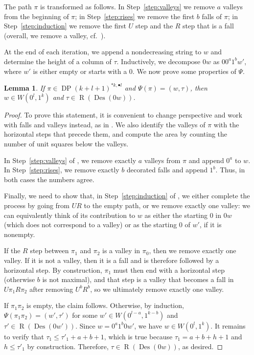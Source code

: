 \documentclass[reqno]{amsart}
\theoremstyle{plain}
\newtheorem{lemma}[theorem]{Lemma}
\theoremstyle{definition}
\theoremstyle{remark}
\DeclareMathOperator{\R}{R}
\DeclareMathOperator{\DP}{DP}
\DeclareMathOperator{\Des}{Des}
\newcommand{\<}{\langle}
\renewcommand{\>}{\rangle}
\begin{document}
The path $\pi$ is transformed as follows. In Step~\ref{step:valleys} we remove $a$ valleys from the beginning of $\pi$; in Step~\ref{step:rises} we remove the first $b$ falls of $\pi$; in Step~\ref{step:induction} we remove the first $U$ step and the $R$ step that is a fall (overall, we remove a valley, cf.\ ).

At the end of each iteration, we append a nondecreasing string to $w$ and determine the height of a column of $\tau$. Inductively, we decompose $0w$ as $0 0^a 1^b w'$, where $w'$ is either empty or starts with a $0$. We now prove some properties of $\Psi$.

\begin{lemma}
    \label{lem:well-defined}
    If $\pi \in \DP(k+l+1)^{\ast k, \bullet l}$ and $\Psi(\pi) = (w,\tau)$, then $w \in W(0^l,1^k)$ and $\tau \in \R(\Des(0w))$.
\end{lemma}

\begin{proof}
    To prove this statement, it is convenient to change perspective and work with falls and valleys instead, as in . We also identify the valleys of $\pi$ with the horizontal steps that precede them, and compute the area by counting the number of unit squares below the valleys.

    In Step~\ref{step:valleys} of , we remove exactly $a$ valleys from $\pi$ and append $0^a$ to $w$. In Step~\ref{step:rises}, we remove exactly $b$ decorated falls and append $1^b$. Thus, in both cases the numbers agree.

    Finally, we need to show that, in Step~\ref{step:induction} of ,
    we either complete the process by going from $UR$ to the empty path, or we remove exactly one valley: we can equivalently think of its contribution to $w$ as either the starting $0$ in $0w$ (which does not correspond to a valley) or as the starting $0$ of $w'$, if it is nonempty.
    
    If the $R$ step between $\pi_1$ and $\pi_2$ is a valley in $\pi_0$, then we remove exactly one valley. If it is not a valley, then it is a fall and is therefore followed by a horizontal step. By construction, $\pi_1$ must then end with a horizontal step (otherwise $b$ is not maximal), and that step is a valley that becomes a fall in $U \pi_1 R \pi_2$ after removing $U^b R^b$, so we ultimately remove exactly one valley.

    If $\pi_1 \pi_2$ is empty, the claim follows. Otherwise, by induction, $\Psi(\pi_1 \pi_2) = (w',\tau')$ for some $w' \in W(0^{l-a},1^{k-b})$ and $\tau' \in \R(\Des(0w'))$. Since $w = 0^a 1^b 0 w'$, we have $w \in W(0^l,1^k)$. It remains to verify that $\tau_1 \leq \tau'_1 + a + b + 1$, which is true because $\tau_1 = a + b + h + 1$ and $h \leq \tau'_1$ by construction. Therefore, $\tau \in \R(\Des(0w))$, as desired.
\end{proof}
\end{document}
